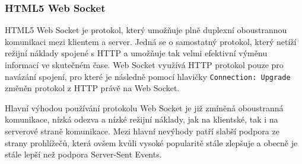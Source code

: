 \subsubsection{HTML5 Web Socket}

HTML5 Web Socket je protokol, který umožňuje plně duplexní oboustrannou komunikaci mezi klientem a server.
Jedná se o samostatný protokol, který netíží režijní náklady spojené s \gls{HTTP} a umožňuje tak velmi efektivní výměnu informací ve skutečném čase.
Web Socket využívá \gls{HTTP} protokol pouze pro navázání spojení, pro které je následně pomocí hlavičky \texttt{Connection: Upgrade} změněn protokol z \gls{HTTP} právě na Web Socket.~\cite{pushpull:websocketQuantum}

Hlavní výhodou používání protokolu Web Socket je již zmíněná oboustranná komunikace, nízká odezva a nízké režijní náklady, jak na klientské, tak i na serverové straně komunikace.
Mezi hlavní nevýhody patří slabší podpora ze strany prohlížečů, která ovšem kvůli vysoké popularitě stále zlepšuje a obecně je stále lepší než podpora Server-Sent Events.~\cite{pushpull:compare}
